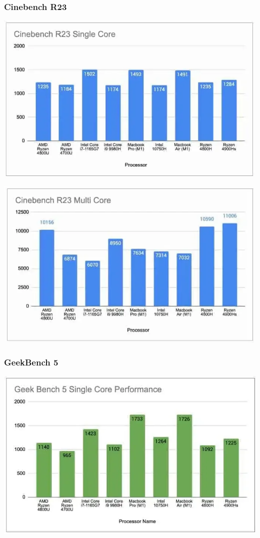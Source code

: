 \documentclass[a4paper]{article}
\begin{document}
\subsubsection{Cinebench R23}

\includegraphics[width=\textwidth]{Cinebench-R23-Single-Core-Apple-M1.png}

\includegraphics[width=\textwidth]{Cinebench-R23-Multi-Core-Apple-M1.png}

\subsubsection{GeekBench 5}

\includegraphics[width=\textwidth]{Geekbench-5-Single-Core.png}
\end{document}
